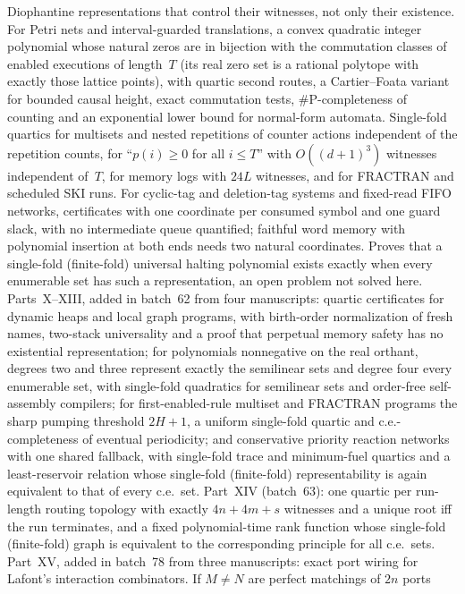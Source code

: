 \documentclass[11pt]{article}
\begin{document}
{Diophantine representations that control their witnesses, not only their
existence.  For Petri nets and interval-guarded translations, a convex
quadratic integer polynomial whose natural zeros are in bijection with the
commutation classes of enabled executions of length~$T$ (its real zero set
is a rational polytope with exactly those lattice points), with quartic
second routes, a Cartier--Foata variant for bounded causal height, exact
commutation tests, $\#\mathrm P$-completeness of counting and an
exponential lower bound for normal-form automata.  Single-fold quartics for
multisets and nested repetitions of counter actions independent of the
repetition counts, for ``$p(i)\ge0$ for all $i\le T$'' with $O((d+1)^3)$
witnesses independent of~$T$, for memory logs with $24L$ witnesses, and for
FRACTRAN and scheduled SKI runs.  For cyclic-tag and deletion-tag systems
and fixed-read FIFO networks, certificates with one coordinate per consumed
symbol and one guard slack, with no intermediate queue quantified; faithful
word memory with polynomial insertion at both ends needs two natural
coordinates.  Proves that a single-fold (finite-fold) universal halting
polynomial exists exactly when every enumerable set has such a
representation, an open problem not solved here.  Parts~X--XIII, added in
batch~62 from four manuscripts: quartic certificates for dynamic heaps and
local graph programs, with birth-order normalization of fresh names,
two-stack universality and a proof that perpetual memory safety has no
existential representation; for polynomials nonnegative on the real orthant,
degrees two and three represent exactly the semilinear sets and degree four
every enumerable set, with single-fold quadratics for semilinear sets and
order-free self-assembly compilers; for first-enabled-rule multiset and
FRACTRAN programs the sharp pumping threshold $2H+1$, a uniform single-fold
quartic and c.e.-completeness of eventual periodicity; and conservative
priority reaction networks with one shared fallback, with single-fold trace
and minimum-fuel quartics and a least-reservoir relation whose single-fold
(finite-fold) representability is again equivalent to that of every c.e.\ set.
Part~XIV (batch~63): one quartic per run-length routing topology with exactly
$4n+4m+s$ witnesses and a unique root iff the run terminates, and a fixed
polynomial-time rank function whose single-fold (finite-fold) graph is
equivalent to the corresponding principle for all c.e.\ sets.  Part~XV, added
in batch~78 from three manuscripts: exact port wiring for Lafont's
interaction combinators.  If $M\ne N$ are perfect matchings of $2n$ ports
}
\end{document}
